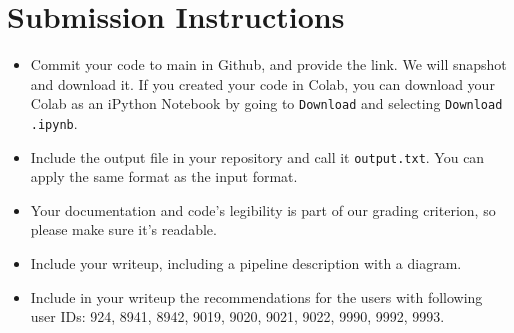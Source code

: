 \documentclass[paper=a4, fontsize=11pt]{scrartcl} %
\begin{document}
\section{Submission Instructions}

\begin{itemize}
    \item Commit your code to main in Github, and provide the link. We will snapshot and download it. If you created your code in Colab, you can download your Colab as an iPython Notebook by going to \verb"Download" and selecting \verb"Download .ipynb". 
    \item Include the output file in your repository and call it \verb"output.txt". You can apply the same format as the input format.
    \item Your documentation and code's legibility is part of our grading criterion, so please make sure it's readable.
    \item Include your writeup, including a pipeline description with a diagram.
    \item Include in your writeup the recommendations for the users with following user IDs: 924, 8941, 8942, 9019, 9020, 9021, 9022, 9990, 9992, 9993.
\end{itemize}
\end{document}
